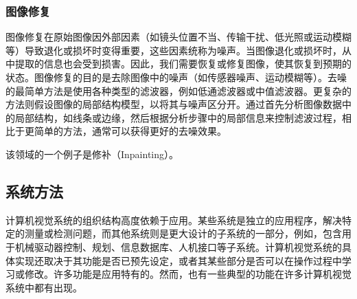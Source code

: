 \subsubsection{图像修复}  
图像修复在原始图像因外部因素（如镜头位置不当、传输干扰、低光照或运动模糊等）导致退化或损坏时变得重要，这些因素统称为噪声。当图像退化或损坏时，从中提取的信息也会受到损害。因此，我们需要恢复或修复图像，使其恢复到预期的状态。图像修复的目的是去除图像中的噪声（如传感器噪声、运动模糊等）。去噪的最简单方法是使用各种类型的滤波器，例如低通滤波器或中值滤波器。更复杂的方法则假设图像的局部结构模型，以将其与噪声区分开。通过首先分析图像数据中的局部结构，如线条或边缘，然后根据分析步骤中的局部信息来控制滤波过程，相比于更简单的方法，通常可以获得更好的去噪效果。

该领域的一个例子是修补（Inpainting）。
\subsection{系统方法}  
计算机视觉系统的组织结构高度依赖于应用。某些系统是独立的应用程序，解决特定的测量或检测问题，而其他系统则是更大设计的子系统的一部分，例如，包含用于机械驱动器控制、规划、信息数据库、人机接口等子系统。计算机视觉系统的具体实现还取决于其功能是否已预先设定，或者其某些部分是否可以在操作过程中学习或修改。许多功能是应用特有的。然而，也有一些典型的功能在许多计算机视觉系统中都有出现。
